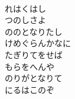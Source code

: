 \documentclass[10pt,b5j]{tarticle} %
\begin{document}
\begin{enumerate}
\begin{minipage}[c]{\blocksize}
    \end{minipage}
    \begin{minipage}[c]{\blocksize}
        
        \vspace{\linespace}
        \item~\\
        れはくはし\\
        つのしさよ\\
        ののとなりたし\\
        けめぐらんかなに\\
        たぎりてをせば\\
        もらをへんや\\
        のりがとなりて\\
        にるはこのぞ
    
    \end{minipage}
\end{enumerate} %
\end{document}
